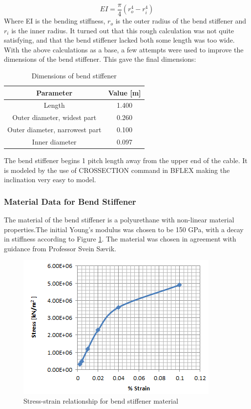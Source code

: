  \begin{equation}
  EI = \frac{\pi}{4}(r_o^4 - r_i^4) 
\end{equation}
 Where EI is the bending stiffness, $r_o$ is the outer radius of the bend stiffener and $r_i$ is the inner radius.\newline 
\newline 
It turned out that this rough calculation was not quite satisfying, and that the bend stiffener lacked both some length was too wide. With the above calculations as a base, a few attempts were used to improve the dimensions of the bend stiffener. This gave the final dimensions: 
 \begin{table} [H]
\centering
\begin{tabular}{ |c|c|}
\hline
Parameter & Value [m] \\
 \hline
 \hline
 
 Length & 1.400 \\
 
Outer diameter, widest part & 0.260\\

Outer diameter, narrowest part & 0.100\\

 Inner diameter & 0.097 \\
 

 \hline
\end{tabular}
\caption{Dimensions of bend stiffener}
\label{table:dim}
\end{table}
\noindent The bend stiffener begins 1 pitch length away from the upper end of the cable. It is modeled by the use of CROSSECTION command in BFLEX making the inclination very easy to model.  

\subsubsection{Material Data for Bend Stiffener}
The material of the bend stiffener is a polyurethane with non-linear material properties.The initial Young's modulus was chosen to be 150 GPa, with a decay in stiffness according to  Figure \ref{fig:matbend}. The material was chosen in agreement with guidance from Professor Svein Sævik. 

\begin{figure}[H]
\centering
\includegraphics[scale=0.8]{figures/matbend}
\caption[$\; \:$ Stress-strain relationship for bend stiffener material]{Stress-strain relationship for bend stiffener material}
 \label{fig:matbend}
\end{figure}

